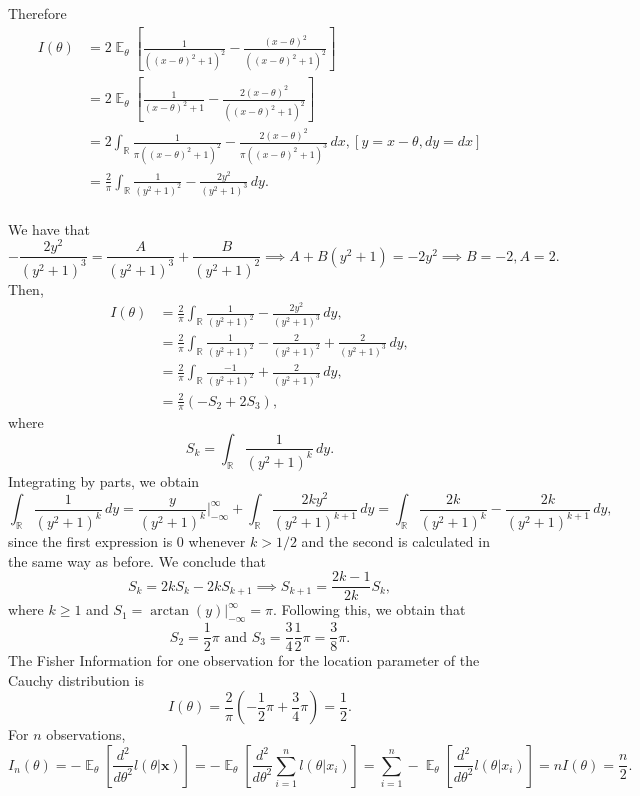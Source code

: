 \documentclass[a4paper,10pt, notitlepage]{report}
\theoremstyle{plain}
\newcommand{\ev}{\operatorname{\mathbb{E}}}
\newcommand{\bx}{\boldsymbol{x}} %
\newcommand{\R}{\mathbb{R}}
\begin{document}
Therefore 
\begin{equation}
    \label{eq:ficher-cauchy-p1}
    \begin{split}
        I(\theta) &= 2\ev_{\theta}\left[\frac{1}{((x - \theta)^2 + 1)^2} - \frac{(x - \theta)^2}{((x - \theta)^2 + 1)^2}\right] \\
        &= 2\ev_{\theta}\left[\frac{1}{(x - \theta)^2 + 1} - \frac{2(x - \theta)^2}{((x - \theta)^2 + 1)^2}\right] \\
        &= 2\int_{\R} \frac{1}{\pi((x - \theta)^2 + 1)^2} - \frac{2(x - \theta)^2}{\pi((x - \theta)^2 + 1)^3} \, dx, [y = x - \theta, dy = dx] \\
        &= \frac{2}{\pi}\int_{\R} \frac{1}{(y^2 + 1)^2} - \frac{2y^2}{(y^2 + 1)^3} \, dy. \\
    \end{split}
\end{equation}

We have that 
$$
- \frac{2y^2}{(y^2 + 1)^3} = \frac{A}{(y^2+1)^3} + \frac{B}{(y^2+1)^2} \implies A + B(y^2 + 1) = -2y^2 \implies B = -2, A = 2.
$$
Then, 
\begin{equation}
    \label{eq:ficher-cauchy-p2}
    \begin{split}
        I(\theta) &= \frac{2}{\pi}\int_{\R} \frac{1}{(y^2 + 1)^2} - \frac{2y^2}{(y^2 + 1)^3} \, dy, \\
        &= \frac{2}{\pi}\int_{\R} \frac{1}{(y^2 + 1)^2} - \frac{2}{(y^2 + 1)^2} + \frac{2}{(y^2 + 1)^3} \, dy, \\ 
        &= \frac{2}{\pi}\int_{\R} \frac{-1}{(y^2 + 1)^2} + \frac{2}{(y^2 + 1)^3} \, dy, \\ 
        &= \frac{2}{\pi}(-S_2 + 2S_3),
    \end{split}
\end{equation}
where
$$
S_k = \int_{\R} \frac{1}{(y^2 + 1)^k} \, dy.
$$
Integrating by parts, we obtain 
$$
\int_{\R} \frac{1}{(y^2 + 1)^k} \,dy = \frac{y}{(y^2 + 1)^k}\bigg|_{-\infty}^{\infty} + \int_{\R} \frac{2ky^2}{(y^2 + 1)^{k+1}} \, dy = \int_{\R} \frac{2k}{(y^2 + 1)^k} - \frac{2k}{(y^2 + 1)^{k+1}} \, dy, 
$$
since the first expression is 0 whenever $k > 1/2$ and the second is
calculated in the same way as before. We conclude that 
$$
S_k =2k S_k - 2k S_{k+1} \implies S_{k+1} = \frac{2k - 1}{2k}S_k,
$$
where $k \ge 1$ and $S_1 = \arctan(y)\big|_{-\infty}^{\infty} = \pi$.
Following this, we obtain that 
$$
S_2 = \frac{1}{2}\pi \text{ and }S_3 = \frac{3}{4}\frac{1}{2}\pi = \frac{3}{8}\pi.
$$
The Fisher Information for one observation for the location parameter of the
Cauchy distribution is
\begin{equation}
    \label{eq:fisher-cauchy}
    I(\theta) = \frac{2}{\pi}\left({-\frac{1}{2}\pi + \frac{3}{4}\pi}\right) = \frac{1}{2}.
\end{equation}
For $n$ observations, 
\begin{equation}
    \label{eq:fisher-cauchy-n}
    I_n(\theta) = -\ev_{\theta}\left[\frac{d^2}{d\theta^2}l(\theta|\bx)\right] = -\ev_{\theta}\left[\frac{d^2}{d\theta^2}\sum_{i=1}^n l(\theta|x_i)\right] = \sum_{i=1}^n -\ev_{\theta}\left[\frac{d^2}{d\theta^2}l(\theta|x_i)\right] = nI(\theta) = \frac{n}{2}.
\end{equation}
\end{document}
